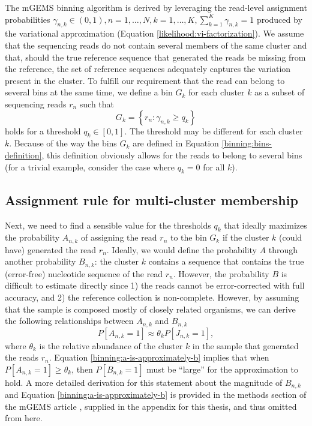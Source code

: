\documentclass[officiallayout]{tktla}
\begin{document}
The mGEMS binning algorithm is derived by leveraging the read-level
assignment probabilities $\gamma_{n, k} \in \left(0, 1\right), n = 1,
\dots, N, k = 1, \dots, K, \sum_{k = 1}^{K}\gamma_{n, k} = 1$ produced
by the variational approximation (Equation
\ref{likelihood:vi-factorization}). We assume that the sequencing
reads do not contain several members of the same cluster and that,
should the true reference sequence that generated the reads be missing
from the reference, the set of reference sequences adequately captures
the variation present in the cluster. To fulfill our requirement that
the read can belong to several bins at the same time, we define a bin
$G_{k}$ for each cluster $k$ as a subset of sequencing reads $r_{n}$
such that
\begin{equation}
  \label{binning:bins-definition}
  G_{k} = \left\{r_{n} : \gamma_{n, k} \geq q_{k}\right\}
\end{equation}
holds for a threshold $q_{k} \in \left[0, 1\right]$. The threshold may
be different for each cluster $k$. Because of the way the bins $G_{k}$
are defined in Equation \ref{binning:bins-definition}, this definition
obviously allows for the reads to belong to several bins (for a
trivial example, consider the case where $q_{k} = 0$ for all $k$).

\subsection{Assignment rule for multi-cluster membership}

Next, we need to find a sensible value for the thresholds $q_{k}$ that
ideally maximizes the probability $A_{n, k}$ of assigning the read
$r_{n}$ to the bin $G_{k}$ if the cluster $k$ (could have) generated
the read $r_{n}$. Ideally, we would define the probability $A$ through
another probability $B_{n, k}$: the cluster $k$ contains a sequence
that contains the true (error-free) nucleotide sequence of the read
$r_{n}$. However, the probability $B$ is difficult to estimate
directly since 1) the reads cannot be error-corrected with full
accuracy, and 2) the reference collection is non-complete. However, by
assuming that the sample is composed mostly of closely related
organisms, we can derive the following relationships between $A_{n,
  k}$ and $B_{n, k}$
\begin{equation}
  \label{binning:a-is-approximately-b}
  P\left[A_{n, k} = 1\right] \approx \theta_{k}P\left[J_{n, k} = 1\right],
\end{equation}
where $\theta_k$ is the relative abundance of the cluster $k$ in the
sample that generated the reads $r_{n}$. Equation
\ref{binning:a-is-approximately-b} implies that when $P\left[A_{n, k}
  = 1\right] \geq \theta_{k}$, then $P\left[B_{n, k} = 1\right]$ must
be ``large'' for the approximation to hold. A more detailed derivation
for this statement about the magnitude of $B_{n, k}$ and Equation
\ref{binning:a-is-approximately-b} is provided in the methods section
of the mGEMS article \cite{maklin_bacterial_2021}, supplied in the
appendix for this thesis, and thus omitted from here.
\end{document}
